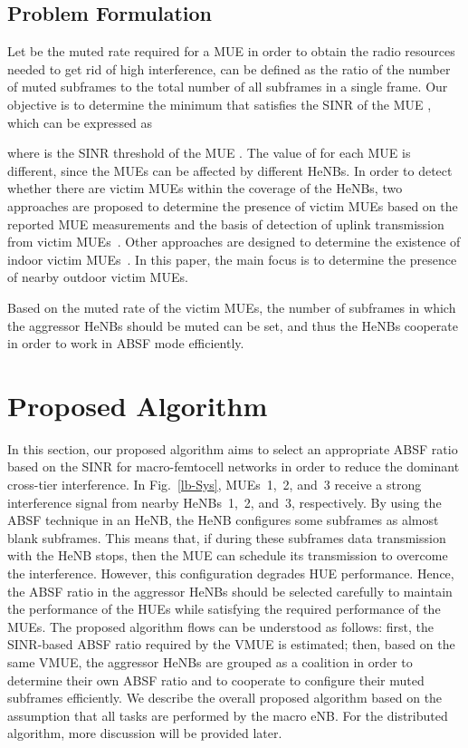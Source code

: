 \documentclass[paper]{ieice}
\begin{document}
\subsection{Problem Formulation}
\label{lb-Obj}
Let  be the muted rate required for a MUE  in order to obtain the radio resources needed to get rid of high interference,  can be defined as the ratio of the number of muted subframes to the total number of all subframes in a single frame. Our objective is to determine the minimum  that satisfies the SINR  of the MUE , which can be expressed as

where  is the SINR threshold of the MUE . The value of  for each MUE  is different, since the MUEs can be affected by different HeNBs. In order to detect whether there are victim MUEs within the coverage of the HeNBs, two approaches are proposed to determine the presence of victim MUEs based on the reported MUE measurements and the basis of detection of uplink transmission from victim MUEs~\cite{TR-36921}. Other approaches are designed to determine the existence of indoor victim MUEs~\cite{Yang2011}. In this paper, the main focus is to determine the presence of nearby outdoor victim MUEs.

Based on the muted rate  of the victim MUEs, the number of subframes in which the aggressor HeNBs should be muted can be set, and thus the HeNBs cooperate in order to work in ABSF mode efficiently.

\section{Proposed Algorithm}
\label{ProposedAL}
In this section, our proposed algorithm aims to select an appropriate ABSF ratio based on the SINR for macro-femtocell networks in order to reduce the dominant cross-tier interference. In Fig.~\ref{lb-Sys}, MUEs~1,~2, and~3 receive a strong interference signal from nearby HeNBs~1,~2, and~3, respectively. By using the ABSF technique in an HeNB, the HeNB configures some subframes as almost blank subframes. This means that, if during these subframes data transmission with the HeNB stops, then the MUE can schedule its transmission to overcome the interference. However, this configuration degrades HUE performance. Hence, the ABSF ratio in the aggressor HeNBs should be selected carefully to maintain the performance of the HUEs while satisfying the required performance of the MUEs. The proposed algorithm flows can be understood as follows: first, the SINR-based ABSF ratio required by the VMUE is estimated; then, based on the same VMUE, the aggressor HeNBs are grouped as a coalition in order to determine their own ABSF ratio and to cooperate to configure their muted subframes efficiently. We describe the overall proposed algorithm based on the assumption that all tasks are performed by the macro eNB. For the distributed algorithm, more discussion will be provided later.
\end{document}
